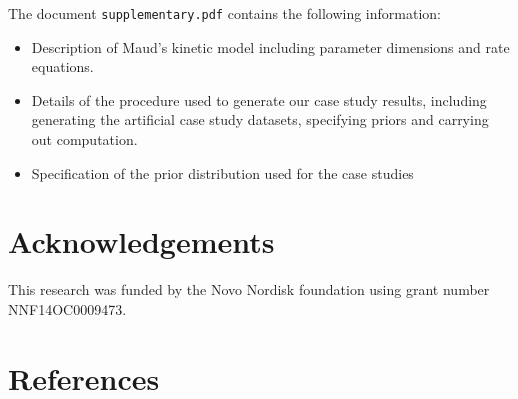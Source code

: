 \documentclass[journal=asbcd6,manuscript=article,layout=traditional]{achemso}
\providecommand{\tightlist}{%
  \setlength{\itemsep}{0pt}\setlength{\parskip}{0pt}}\usepackage{longtable,booktabs,array}
\begin{document}
The document \texttt{supplementary.pdf} contains the following
information:

\begin{itemize}
\tightlist
\item
  Description of Maud's kinetic model including parameter dimensions and
  rate equations.
\item
  Details of the procedure used to generate our case study results,
  including generating the artificial case study datasets, specifying
  priors and carrying out computation.
\item
  Specification of the prior distribution used for the case studies
\end{itemize}

\hypertarget{acknowledgements}{%
\section{Acknowledgements}\label{acknowledgements}}

This research was funded by the Novo Nordisk foundation using grant
number NNF14OC0009473.

\hypertarget{references}{%
\section{References}\label{references}}

\renewcommand{\bibsection}{}

\end{document}

